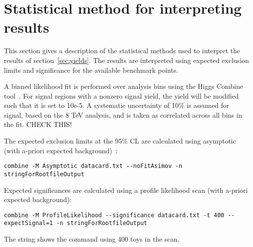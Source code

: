 \section{Statistical method for interpreting results}
\label{sec:statisticalMethod}

This section gives a description of the statistical methods used to interpret the results of section~\ref{sec:yields}.
The results are interpreted using expected exclusion limits and significance for the available benchmark points.

A binned likelihood fit is performed over analysis bins using the Higgs Combine tool~\cite{url:higgscombine}. 
For signal regions with a nonzero signal yield, the yield will be modified such that it is set to 10e-5.
A systematic uncertainty of 10\% is assumed for signal, based on the 8 TeV analysis, and is taken as correlated across all bins in the fit. 
{\color{red} CHECK THIS!}

The expected exclusion limits at the 95\% CL are calculated using asymptotic \CLs (with a-priori expected background)~\cite{Cowan:2010js}:
{\small
\begin{verbatim}
combine -M Asymptotic datacard.txt --noFitAsimov -n stringForRootfileOutput
\end{verbatim}
}

Expected significances are calculated using a profile likelihood scan (with a-priori expected background):
{\footnotesize
\begin{verbatim}
combine -M ProfileLikelihood --significance datacard.txt -t 400 --expectSignal=1 -n stringForRootfileOutput
\end{verbatim}
}
The string shows the command using 400 toys in the scan.
